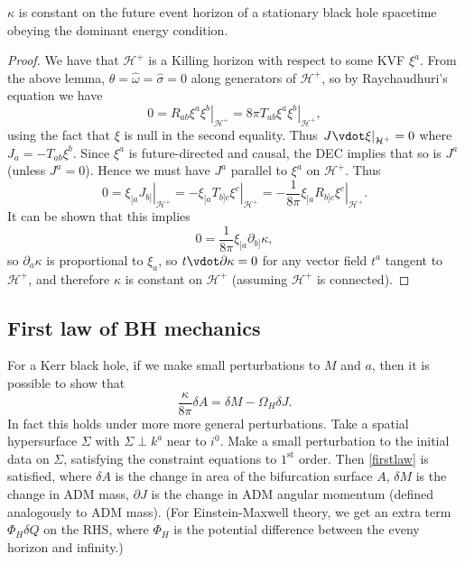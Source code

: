 \documentclass{jknotes}
\begin{document}
\begin{theorem}
    \(\kappa\) is constant on the future event horizon of a stationary black hole spacetime obeying the dominant energy condition.
\end{theorem}
\begin{proof}
    We have that \(\mathcal{H}^+\) is a Killing horizon with respect to some KVF \(\xi^a\). From the above lemma, \(\theta=\hat{\omega}=\hat{\sigma}=0\) along generators of \(\mathcal{H}^+\), so by Raychaudhuri's equation we have
    \begin{equation}
        0 = \left.R_{ab}\xi^a\xi^b\right|_{\mathcal{H}^+} = \left.8\pi T_{ab}\xi^a\xi^b\right|_{\mathcal{H}^+},
    \end{equation}
    using the fact that \(\xi\) is null in the second equality. Thus \(\left.J\vdot\xi\right|_{\mathcal{H}^+}=0\) where \(J_a=-T_{ab}\xi^b\). Since \(\xi^a\) is future-directed and causal, the DEC implies that so is \(J^a\) (unless \(J^a=0\)). Hence we must have \(J^a\) parallel to \(\xi^a\) on \(\mathcal{H}^+\). Thus
    \begin{equation}
        0 = \left.\xi_{[a}J_{b]}\right|_{\mathcal{H}^+} = -\left.\xi_{[a}T_{b]c}\xi^c\right|_{\mathcal{H}^+} = -\frac{1}{8\pi}\left.\xi_{[a}R_{b]c}\xi^c\right|_{\mathcal{H}^+}.
    \end{equation}
    It can be shown that this implies
    \begin{equation}
        0 = \frac{1}{8\pi}\xi_{[a}\partial_{b]}\kappa,
    \end{equation}
    so \(\partial_a{\kappa}\) is proportional to \(\xi_a\), so \(t\vdot\partial\kappa=0\) for any vector field \(t^a\) tangent to \(\mathcal{H}^+\), and therefore \(\kappa\) is constant on \(\mathcal{H}^+\) (assuming \(\mathcal{H}^+\) is connected).
\end{proof}

\subsection{First law of BH mechanics}
For a Kerr black hole, if we make small perturbations to \(M\) and \(a\), then it is possible to show that
\begin{equation}
    \frac{\kappa}{8\pi}\delta A = \delta M - \Omega_H \delta J.
    \tag{\(*\)}
    \label{firstlaw}
\end{equation}
In fact this holds under more more general perturbations. Take a spatial hypersurface \(\Sigma\) with \(\Sigma \perp k^a\) near to \(i^0\). Make a small perturbation to the initial data on \(\Sigma\), satisfying the constraint equations to \(1^{\text{st}}\) order. Then \eqref{firstlaw} is satisfied, where \(\delta A\) is the change in area of the bifurcation surface \(A\), \(\delta M\) is the change in ADM mass, \(\partial J\) is the change in ADM angular momentum (defined analogously to ADM mass). (For Einstein-Maxwell theory, we get an extra term \(\Phi_H \delta Q\) on the RHS, where \(\Phi_H\) is the potential difference between the eveny horizon and infinity.)
\end{document}
